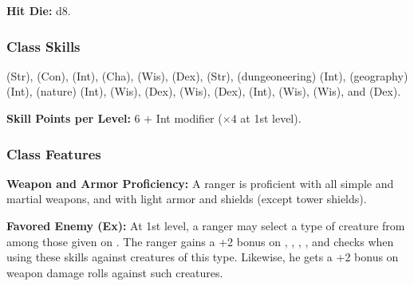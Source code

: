 \textbf{Hit Die:} d8.

\subsubsection{Class Skills}
 (Str),  (Con),  (Int),  (Cha),  (Wis),  (Dex),  (Str),  (dungeoneering) (Int),  (geography) (Int),  (nature) (Int),  (Wis),  (Dex),  (Wis),  (Dex),  (Int),  (Wis),  (Wis), and  (Dex).

\textbf{Skill Points per Level:} 6 + Int modifier ($\times 4$ at 1st level).

\subsubsection{Class Features}
\textbf{Weapon and Armor Proficiency:} A ranger is proficient with all simple and martial weapons, and with light armor and shields (except tower shields).


\textbf{Favored Enemy (Ex):} At 1st level, a ranger may select a type of creature from among those given on . The ranger gains a +2 bonus on , , , , and  checks when using these skills against creatures of this type. Likewise, he gets a +2 bonus on weapon damage rolls against such creatures.

